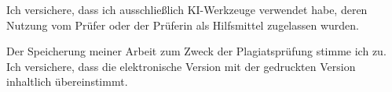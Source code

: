 Ich versichere, dass ich ausschließlich KI-Werkzeuge verwendet habe, deren Nutzung vom Prüfer oder der Prüferin als Hilfsmittel zugelassen wurden.

\unterschriftsblock

\vspace{1cm}
Der Speicherung meiner Arbeit zum Zweck der Plagiatsprüfung stimme ich zu. Ich versichere, dass die elektronische Version mit der gedruckten Version inhaltlich übereinstimmt.

\unterschriftsblock
